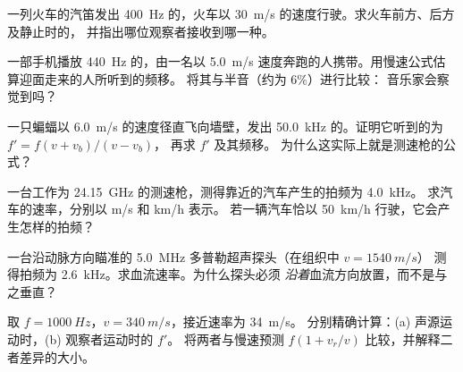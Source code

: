 \begin{exercise}[$\star$]\label{exo:g12:doppler-effect:4}
一列火车的汽笛发出 \qty{400}{Hz} 的，火车以 \qty{30}{m/s} 的速度行驶。求火车前方、后方及静止时的，
并指出哪位观察者接收到哪一种。
\end{exercise}

\begin{exercise}[$\star$]\label{exo:g12:doppler-effect:5}
一部手机播放 \qty{440}{Hz} 的，由一名以 \qty{5.0}{m/s} 速度奔跑的人携带。用慢速公式估算迎面走来的人所听到的频移。
将其与半音（约为 $6\%$）进行比较：
音乐家会察觉到吗？
\end{exercise}

\begin{exercise}[$\star\star$]\label{exo:g12:doppler-effect:6}
一只蝙蝠以 \qty{6.0}{m/s} 的速度径直飞向墙壁，发出 \qty{50.0}{kHz} 的。证明它听到的为 $f' = f(v + v_b)/(v - v_b)$，
再求 $f'$ 及其频移。
为什么这实际上就是测速枪的公式？
\end{exercise}

\begin{exercise}[$\star\star$]\label{exo:g12:doppler-effect:7}
一台工作为 \qty{24.15}{GHz} 的测速枪，测得靠近的汽车产生的拍频为 \qty{4.0}{kHz}。
求汽车的速率，分别以 \unit{m/s} 和 \unit{km/h} 表示。
若一辆汽车恰以 \qty{50}{km/h} 行驶，它会产生怎样的拍频？
\end{exercise}

\begin{exercise}[$\star\star$]\label{exo:g12:doppler-effect:8}
一台沿动脉方向瞄准的 \qty{5.0}{MHz} 多普勒超声探头（在组织中 $v = \qty{1540}{m/s}$）
测得拍频为 \qty{2.6}{kHz}。求血流速率。为什么探头必须
\emph{沿着}血流方向放置，而不是与之垂直？
\end{exercise}

\begin{exercise}[$\star\star$]\label{exo:g12:doppler-effect:9}
取 $f = \qty{1000}{Hz}$，$v = \qty{340}{m/s}$，接近速率为 \qty{34}{m/s}。
分别精确计算：(a) 声源运动时，(b) 观察者运动时的 $f'$。
将两者与慢速预测 $f(1 + v_r/v)$ 比较，并解释二者差异的大小。
\end{exercise}

